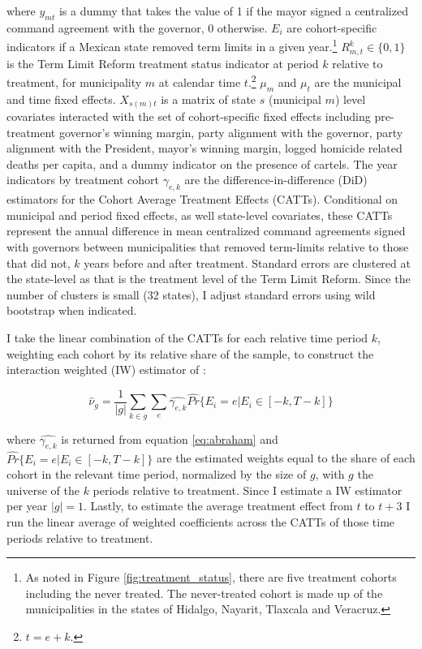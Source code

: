 where $y_{mt}$ is a dummy that takes the value of 1 if the mayor signed a centralized command agreement with the governor, 0 otherwise. $E_i$ are cohort-specific indicators if a Mexican state removed term limits in a given year.\footnote{As noted in Figure \ref{fig:treatment_status}, there are five treatment cohorts including the never treated. The never-treated cohort is made up of the municipalities in the states of Hidalgo, Nayarit, Tlaxcala and Veracruz.} $R^k_{m,t}\in \{0,1\}$  is the Term Limit Reform treatment status indicator at period $k$ relative to treatment, for municipality $m$ at calendar time $t$.\footnote{$t=e+k$.} $\mu_m$ and $\mu_t$ are the municipal and time fixed effects. $X_{s(m)t}$ is a matrix of state $s$ (municipal $m$) level covariates interacted with the set of cohort-specific fixed effects including pre-treatment governor's winning margin, party alignment with the governor, party alignment with the President, mayor's winning margin, logged homicide related deaths per capita, and a dummy indicator on the presence of cartels.  The year indicators by treatment cohort  $\gamma_{e,k}$ are the difference-in-difference (DiD) estimators for the Cohort Average Treatment Effects (CATTs). Conditional on municipal and period fixed effects, as well state-level covariates, these CATTs represent the annual difference in mean centralized command agreements signed with governors between municipalities that removed term-limits relative to those that did not, $k$ years before and after treatment. Standard errors are clustered at the state-level as that is the treatment level of the Term Limit Reform. Since the number of clusters is small (32 states), I adjust standard errors using wild bootstrap when indicated. 

I take the linear combination of the CATTs for each relative time period $k$, weighting each cohort by its relative share of the sample, to construct the interaction weighted (IW) estimator of \citet{abraham_sun_2020}:   

\begin{equation}
\hat{\nu}_g=\frac{1}{|g|}\sum_{k \in g}\sum_e \hat{\gamma_{e,k}} \hat{Pr}\{E_i=e | E_i \in [-k, T-k]\}	
\end{equation}

where $\hat{\gamma_{e,k}}$ is returned from equation \ref{eq:abraham} and $\hat{Pr}\{E_i=e | E_i \in [-k, T-k]\}$  are the estimated weights equal to the share of each cohort in the relevant time period, normalized by the size of  $g$, with $g$ the universe of the $k$ periods relative to treatment. Since I estimate a IW estimator per year $|g|=1$. Lastly, to estimate the average treatment effect from $t$ to $t+3$ I run the linear average of weighted coefficients across the CATTs of those time periods relative to treatment. 

